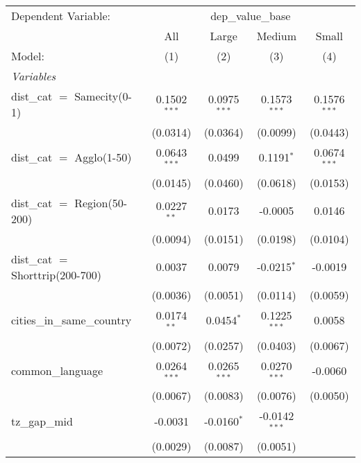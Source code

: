 \begingroup
\centering
\begin{tabular}{lcccc}
   \tabularnewline \midrule \midrule
   Dependent Variable: & \multicolumn{4}{c}{dep\_value\_base}\\
                                     & All             & Large          & Medium          & Small \\   
   Model:                            & (1)             & (2)            & (3)             & (4)\\  
   \midrule
   \emph{Variables}\\
   dist\_cat $=$ Samecity(0-1)       & 0.1502$^{***}$  & 0.0975$^{***}$ & 0.1573$^{***}$  & 0.1576$^{***}$\\   
                                     & (0.0314)        & (0.0364)       & (0.0099)        & (0.0443)\\   
   dist\_cat $=$ Agglo(1-50)         & 0.0643$^{***}$  & 0.0499         & 0.1191$^{*}$    & 0.0674$^{***}$\\   
                                     & (0.0145)        & (0.0460)       & (0.0618)        & (0.0153)\\   
   dist\_cat $=$ Region(50-200)      & 0.0227$^{**}$   & 0.0173         & -0.0005         & 0.0146\\   
                                     & (0.0094)        & (0.0151)       & (0.0198)        & (0.0104)\\   
   dist\_cat $=$ Shorttrip(200-700)  & 0.0037          & 0.0079         & -0.0215$^{*}$   & -0.0019\\   
                                     & (0.0036)        & (0.0051)       & (0.0114)        & (0.0059)\\   
   cities\_in\_same\_country         & 0.0174$^{**}$   & 0.0454$^{*}$   & 0.1225$^{***}$  & 0.0058\\   
                                     & (0.0072)        & (0.0257)       & (0.0403)        & (0.0067)\\   
   common\_language                  & 0.0264$^{***}$  & 0.0265$^{***}$ & 0.0270$^{***}$  & -0.0060\\   
                                     & (0.0067)        & (0.0083)       & (0.0076)        & (0.0050)\\   
   tz\_gap\_mid                      & -0.0031         & -0.0160$^{*}$  & -0.0142$^{***}$ &   \\   
                                     & (0.0029)        & (0.0087)       & (0.0051)        &   \\   

\end{tabular}

